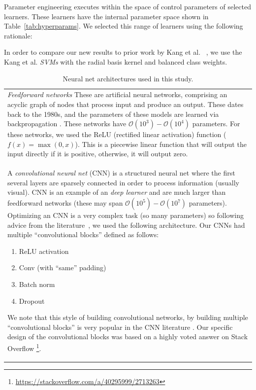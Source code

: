  
 Parameter engineering executes within the
 space of control parameters of selected learners. 
   These learners have the internal parameter space shown 
  in Table~\ref{tab:hyperparams}. 
We selected this range of learners using the following rationale:
 \bi
 \item
   In order to   compare our new results to   prior work by Kang et al. ~\cite{kang2022detecting}, we use the 
   Kang et al. {\em   SVMs}
  with the radial basis kernel and balanced class weights.
\begin{table}[!b]
    \centering
    \caption{Neural net architectures used
    in this study.}
    \label{tab:nnhere}
    
      \small
    \begin{tabular}{p{8.5cm}}
        \toprule
    \rowcolor{gray!15}
     {\em Feedforward networks}
     These are   artificial neural networks, comprising an acyclic graph of nodes that process input and produce an output. These dates back to the 1980s, and the parameters of these models are learned via backpropagation \cite{rumelhart1986learning}. 
       These networks have $\mathcal{O}(10^3)-\mathcal{O}(10^4)$ parameters. 
     For these networks, we used the    ReLU  (rectified linear activation)    function ($f(x) = \max (0, x)$).
     This is a  piecewise linear function that will output the input directly if it is positive, otherwise, it will output zero.  
        ~\\
        A {\em convolutional neural net} (CNN) is a structured neural net where the first several layers are sparsely connected in order to process information (usually visual).
        CNN is an example of an  
        {\em deep learner} and  are much larger than
        feedforward networks (these may   span $\mathcal{O}(10^5)-\mathcal{O}(10^7)$ parameters).
        Optimizing an CNN is a very complex task (so many parameters) so
        following   advice from the literature~\cite{ioffe2015batch,srivastava2014dropout}, we used the following architecture. Our CNNs had multiple ``convolutional blocks'' defined as follows:
\begin{enumerate}
    \item ReLU activation
    \item Conv (with ``same'' padding)
    \item Batch norm \cite{ioffe2015batch}
    \item Dropout \cite{srivastava2014dropout} 
\end{enumerate}

We note that this style of building convolutional networks, by building multiple ``convolutional blocks'' is very popular in the CNN literature \cite{krizhevsky2012imagenet,lecun1989backpropagation}. 
Our specific design of the convolutional blocks was based on a highly voted answer on Stack Overflow \footnote{\url{https://stackoverflow.com/a/40295999/2713263}}.


\end{tabular}
\end{table}
